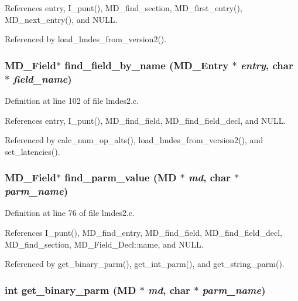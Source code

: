References entry, I\_\-punt(), MD\_\-find\_\-section, MD\_\-first\_\-entry(), MD\_\-next\_\-entry(), and NULL.

Referenced by load\_\-lmdes\_\-from\_\-version2().
\subsubsection{\setlength{\rightskip}{0pt plus 5cm}\bf{MD\_\-Field}$\ast$ find\_\-field\_\-by\_\-name (\bf{MD\_\-Entry} $\ast$ {\em entry}, char $\ast$ {\em field\_\-name})}\label{lmdes2_8c_d8b800468ff0c9640e7b77394d5d0ae2}




Definition at line 102 of file lmdes2.c.

References entry, I\_\-punt(), MD\_\-find\_\-field, MD\_\-find\_\-field\_\-decl, and NULL.

Referenced by calc\_\-num\_\-op\_\-alts(), load\_\-lmdes\_\-from\_\-version2(), and set\_\-latencies().
\subsubsection{\setlength{\rightskip}{0pt plus 5cm}\bf{MD\_\-Field}$\ast$ find\_\-parm\_\-value (\bf{MD} $\ast$ {\em md}, char $\ast$ {\em parm\_\-name})}\label{lmdes2_8c_8c53cfcfc329fbf79f3f646dad15c6af}




Definition at line 76 of file lmdes2.c.

References I\_\-punt(), MD\_\-find\_\-entry, MD\_\-find\_\-field, MD\_\-find\_\-field\_\-decl, MD\_\-find\_\-section, MD\_\-Field\_\-Decl::name, and NULL.

Referenced by get\_\-binary\_\-parm(), get\_\-int\_\-parm(), and get\_\-string\_\-parm().
\subsubsection{\setlength{\rightskip}{0pt plus 5cm}int get\_\-binary\_\-parm (\bf{MD} $\ast$ {\em md}, char $\ast$ {\em parm\_\-name})}\label{lmdes2_8c_02d89f445d36e1ba6e2cce84865d2689}





